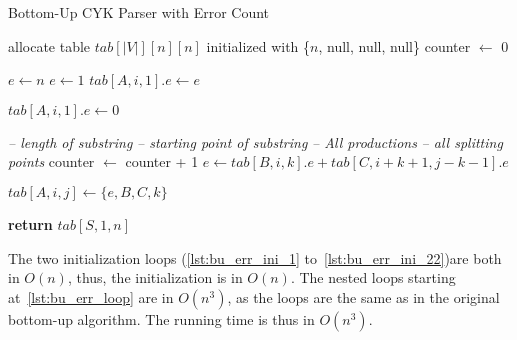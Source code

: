 \begin{algorithm}[H]
    \caption{Bottom-Up CYK Parser with Error Count}
    \label{alg:bu_err}
    \begin{algorithmic}[1]
        \State allocate table $tab[|V|][n][n]$ initialized with \{$n$, null, null, null\}
        \State counter $\leftarrow$ 0 \label{lst:bu_err_1}
    
         \label{lst:bu_err_ini_1}
            \State $e\leftarrow n$ 
                \State $e \leftarrow 1$
            \EndIf
                \State $tab[A,i,1].e \leftarrow e$
            \EndFor
        \EndFor
        \State
        
         \label{lst:bu_err_ini_2}
                \State $tab[A,i,1].e \leftarrow 0$ \label{lst:bu_err_ini_22}
            \EndFor
        \EndFor
        \State

         \hspace*{2.75cm}\textit{-- length of substring}\label{lst:bu_err_loop}
             \hspace*{1cm}\textit{-- starting point of substring}
                 \hspace*{1.4cm}\textit{-- All productions}
                     \hspace*{0.5cm}\textit{-- all splitting points}
                        \State counter $\leftarrow$ counter + 1
                        \State $e \leftarrow tab[B,i,k].e + tab[C,i+k+1,j-k-1].e$

                         \label{lst:bu_err_comp}
                            \State $tab[A,i,j]\leftarrow \{e, B, C, k\}$
                        \EndIf
                    \EndFor
                \EndFor
            \EndFor
        \EndFor

        \State \textbf{return} $tab[S,1,n]$
        \EndFunction
    \end{algorithmic}
\end{algorithm}


The two initialization loops (\cref{lst:bu_err_ini_1} to~\ref{lst:bu_err_ini_22})are both in $O(n)$, thus, the initialization is in $O(n)$.
The nested loops starting at~\cref{lst:bu_err_loop} are in $O(n^3)$, as the loops are the same as in the original bottom-up algorithm.
The running time is thus in $O(n^3)$.


